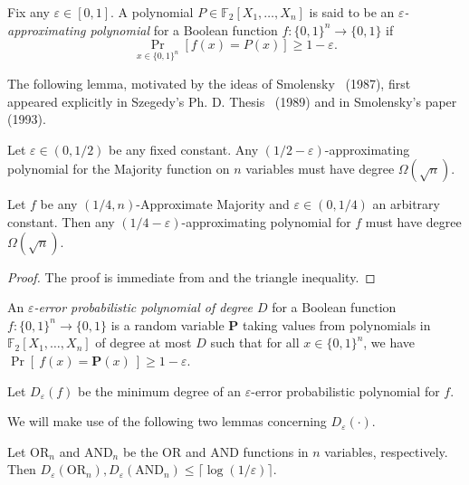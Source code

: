 \documentclass{toc}
\newcommand{\eps}{\varepsilon}
\newcommand{\mb}{\mathbf}
\newcommand{\prob}[2]{\mathop{\mathrm{Pr}}_{#1}[#2]}
\newcommand{\F}{\mathbb{F}}
\begin{document}
\begin{definition}
Fix any $\varepsilon\in [0,1]$. A polynomial $P\in \F_2[X_1,\ldots,X_n]$ is
said to be an \emph{$\varepsilon$-approximating polynomial} for a Boolean
function $f:\{0,1\}^n\rightarrow \{0,1\}$ if 
\[
\prob{x\in \{0,1\}^n}{f(x) = P(x)}\geq 1-\varepsilon.
\]
\end{definition}

%
The following lemma, motivated by the ideas of 
Smolensky~\cite{Smolensky87} (1987), first appeared explicitly in
Szegedy's Ph. D. Thesis~\cite[Theorem 2.4.7]{Szegedy1989} (1989)
and in Smolensky's paper~\cite[Theorem 5]{Smolensky93} (1993).

%
%

\begin{lemma}
\label{lem:razb-maj}
Let $\varepsilon \in (0,{1}/{2})$ be any fixed constant. Any $(1/2-\varepsilon)$-approximating polynomial for the Majority function on $n$ variables must have degree $\Omega(\sqrt{n})$. 
\end{lemma}

\begin{corollary}
\label{cor:approx-maj-deg}
Let $f$ be any $(1/4,n)$-Approximate Majority and $\varepsilon\in (0,1/4)$ an arbitrary constant. Then any $({1}/{4}-\varepsilon)$-approximating polynomial for $f$ must have degree $\Omega(\sqrt{n})$.
\end{corollary}

\begin{proof}
The proof is immediate from  and the triangle inequality.
\end{proof}

\begin{definition}
An \emph{$\eps$-error probabilistic polynomial of degree $D$} for a Boolean function $f : \{0,1\}^n \to \{0,1\}$ is a random variable $\mb P$ taking values from polynomials in $\F_2[X_1,\ldots,X_n]$ of degree at most $D$ such that for all $x \in \{0,1\}^n$, we have $\Pr[\ f(x) = \mb P(x)\ ] \ge 1 - \eps$.
\end{definition}

\begin{definition}
Let $D_\eps(f)$ be the minimum degree of an $\eps$-error probabilistic polynomial for $f$.
\end{definition}

We will make use of the following two lemmas concerning $D_\eps(\cdot)$.

\begin{lemma}
\label{lem:razb-OR}
Let $\mathrm{OR}_n$ and $\mathrm{AND}_n$ be the OR and AND functions
%
in    %
$n$ variables, %
respectively.
%
Then $D_\varepsilon(\mathrm{OR}_n), D_\varepsilon(\mathrm{AND}_n)\leq \lceil \log(1/\varepsilon)\rceil$.
\end{lemma}
\end{document}
